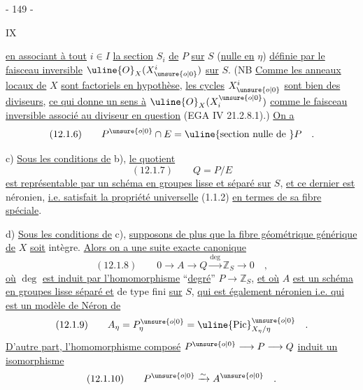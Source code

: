 
\begin{center}- 149 -\end{center}
\begin{flushright}IX\end{flushright}

\uline{en associant à tout} $i\in I$ \uline{la section} $S_i$ \uline{de} $P$ \uline{sur} $S$ (\uline{nulle en} $\eta$) \uline{définie par le faisceau inversible} $\uline{O}_X(X_{\unsure{o|0}}^i)$ \uline{sur} $S$. (NB \uline{Comme les anneaux locaux de} $X$ \uline{sont factoriels en hypothèse}, \uline{les cycles} $X_{\unsure{o|0}}^i$ \uline{sont bien des diviseurs}, \uline{ce qui donne un sens à} $\uline{O}_X(X_i^{\unsure{o|0}})$ \uline{comme le faisceau inversible associé au diviseur en question} (EGA IV 21.2.8.1).) \uline{On a}
\[
(12.1.6)\qquad P^{\unsure{o|0}}\cap E=\text{\uline{section nulle de }}P\quad.
\]

c) \uline{Sous les conditions de} b), \uline{le quotient}
\[
(12.1.7)\qquad Q=P/E
\]
\uline{est représentable par un schéma en groupes lisse et séparé sur} $S$, \uline{et ce dernier est} néronien, \uline{i.e. satisfait la propriété universelle} (1.1.2) \uline{en termes de sa fibre spéciale}.

d) \uline{Sous les conditions de} c), \uline{supposons de plus que la fibre géométrique générique de} $X$ \uline{soit} intègre. \uline{Alors on a une suite exacte canonique}
\[
(12.1.8)\qquad
0\longrightarrow A\longrightarrow Q\xrightarrow{\deg}\mathbb Z_S\longrightarrow0\quad,
\]
\uline{où} $\deg$ \uline{est induit par l'homomorphisme} ``\uline{degré}'' $P\longrightarrow\mathbb Z_S$, \uline{et où} $A$ \uline{est un schéma en groupes lisse séparé et} de type fini \uline{sur} $S$, \uline{qui est également néronien i.e. qui est un modèle de Néron de}
\[
(12.1.9)\qquad A_\eta=P_\eta^{\unsure{o|0}}=\uline{\operatorname{Pic}}^{\unsure{o|0}}_{X_\eta/\eta}\quad.
\]
\uline{D'autre part, l'homomorphisme composé} $P^{\unsure{o|0}}\longrightarrow P\longrightarrow Q$ \uline{induit un isomorphisme}
\[
(12.1.10)\qquad P^{\unsure{o|0}}\xrightarrow{\sim}A^{\unsure{o|0}}\quad.
\]

